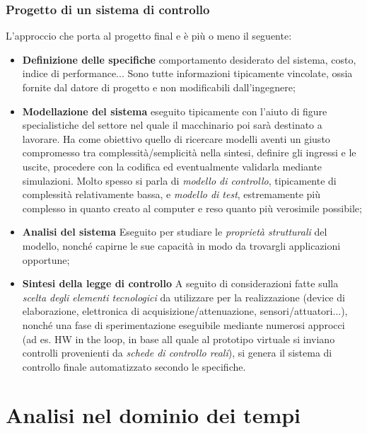 \documentclass[a4paper]{report}
\begin{document}

\section{Progetto di un sistema di controllo}

L'approccio che porta al progetto final e è più o meno il seguente:
\begin{itemize}
	\item \textbf{Definizione delle specifiche} \rarr comportamento desiderato del sistema, costo, indice di performance... Sono tutte informazioni tipicamente vincolate, ossia fornite dal datore di progetto e non modificabili dall'ingegnere;
	\item \textbf{Modellazione del sistema} \rarr eseguito tipicamente con l'aiuto di figure specialistiche del settore nel quale il macchinario poi sarà destinato a lavorare. Ha come obiettivo quello di ricercare modelli aventi un giusto compromesso tra complessità/semplicità nella sintesi, definire gli ingressi e le uscite, procedere con la codifica ed eventualmente validarla mediante simulazioni. Molto spesso si parla di \textit{modello di controllo}, tipicamente di complessità relativamente bassa, e \textit{modello di test}, estremamente più complesso in quanto creato al computer e reso quanto più verosimile possibile;
	\item \textbf{Analisi del sistema} \rarr Eseguito per studiare le \textit{proprietà strutturali} del modello, nonché capirne le sue capacità in modo da trovargli applicazioni opportune;
	\item \textbf{Sintesi della legge di controllo} \rarr A seguito di considerazioni fatte sulla \textit{scelta degli elementi tecnologici} da utilizzare per la realizzazione (device di elaborazione, elettronica di acquisizione/attenuazione, sensori/attuatori...), nonché una fase di sperimentazione eseguibile mediante numerosi approcci (ad es. HW in the loop, in base all quale al prototipo virtuale si inviano controlli provenienti da \textit{schede di controllo reali}), si genera il sistema di controllo finale automatizzato secondo le specifiche.
\end{itemize}

\part{Analisi nel dominio dei tempi}
\end{document}
